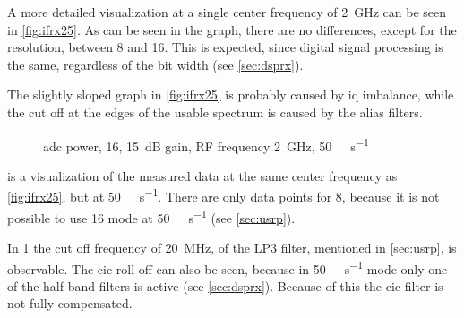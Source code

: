 \documentclass[12pt,a4paper,parskip=full,abstracton]{scrartcl}
\begin{document}
A more detailed visualization at a single center frequency of \SI{2}{\giga\hertz}
can be seen in \cref{fig:ifrx25}. As can be seen in the graph, there are no
differences, except for the resolution, between \SI{8}{\bit} and \SI{16}{\bit}. This
is expected, since digital signal processing is the same, regardless of the bit width
(see \cref{sec:dsprx}).

The slightly sloped graph in \cref{fig:ifrx25} is probably caused by \gls{iq} imbalance,
while the cut off at the edges of the usable spectrum is caused by the alias filters.

\begin{figure}[htb]
    \centering
{}
    \caption{\gls{adc} power, \SI{16}{\bit}, \SI{15}{\deci\bel} gain, RF frequency \SI{2}{\giga\hertz}, \SI{50}{\mega\samples\per\second}}
    \label{fig:ifrx50}
\end{figure}

 is a visualization of the measured data at the same center frequency
as \cref{fig:ifrx25}, but at \SI{50}{\mega\samples\per\second}. There are only
data points for \SI{8}{\bit}, because it is not possible to use \SI{16}{\bit} mode
at \SI{50}{\mega\samples\per\second} (see \cref{sec:usrp}).

In \cref{fig:ifrx50} the cut off frequency of \SI{20}{\mega\hertz}, of the LP3
filter, mentioned in \cref{sec:usrp}, is observable. The \gls{cic} roll off can also be seen, because
in \SI{50}{\mega\samples\per\second} mode only one of the half band filters is
active (see \cref{sec:dsprx}). Because of this the \gls{cic} filter is not
fully compensated.

\clearpage
\end{document}
